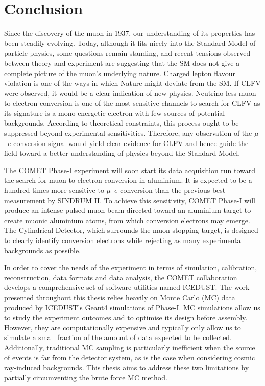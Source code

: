 \chapter{Conclusion}

Since the discovery of the muon in 1937, our understanding of its properties has
been steadily evolving. Today, although it fits nicely into the Standard Model
of particle physics, some questions remain standing, and recent tensions
observed between theory and experiment are suggesting that the SM does not give
a complete picture of the muon's underlying nature. Charged lepton flavour
violation is one of the ways in which Nature might deviate from the SM. If CLFV
were observed, it would be a clear indication of new physics. Neutrino-less
muon-to-electron conversion is one of the most sensitive channels to search for
CLFV as its signature is a mono-energetic electron with few sources of potential
backgrounds. According to theoretical constraints, this process ought to be
suppressed beyond experimental sensitivities. Therefore, any observation of the
$\mu$--$e$ conversion signal would yield clear evidence for CLFV and hence guide
the field toward a better understanding of physics beyond the Standard Model.

The COMET Phase\nobreakdash-I experiment will soon start its data acquisition run toward the
search for muon-to-electron conversion in aluminium. It is expected to be a
hundred times more sensitive to $\mu$--$e$ conversion than the previous best
measurement by SINDRUM II. To achieve this sensitivity, COMET Phase\nobreakdash-I will
produce an intense pulsed muon beam directed toward an aluminium target to
create muonic aluminium atoms, from which conversion electrons may emerge. The
Cylindrical Detector, which surrounds the muon stopping target, is designed to
clearly identify conversion electrons while rejecting as many experimental
backgrounds as possible. 

In order to cover the needs of the experiment in terms of simulation,
calibration, reconstruction, data formats and data analysis, the COMET
collaboration develops a comprehensive set of software utilities named ICEDUST.
The work presented throughout this thesis relies heavily on Monte Carlo (MC) data
produced by ICEDUST's {\sc Geant4} simulations of Phase\nobreakdash-I.
MC simulations allow us to study the experiment outcomes and to optimise its
design before assembly. However, they are computationally expensive and
typically only allow us to simulate a small fraction of the amount of data
expected to be collected. Additionally, traditional MC sampling is particularly
inefficient when the source of events is far from the detector system, as is the
case when considering cosmic ray-induced backgrounds. This thesis aims to
address these two limitations by partially circumventing the brute force MC
method.

